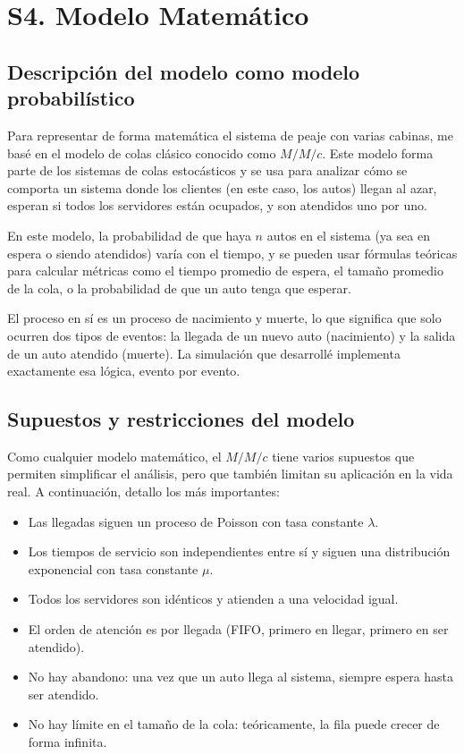 \documentclass[12pt]{article}
\begin{document}
\section*{S4. Modelo Matemático}

\subsection*{Descripción del modelo como modelo probabilístico}

Para representar de forma matemática el sistema de peaje con varias cabinas, me basé en el modelo de colas clásico conocido como $M/M/c$. Este modelo forma parte de los sistemas de colas estocásticos y se usa para analizar cómo se comporta un sistema donde los clientes (en este caso, los autos) llegan al azar, esperan si todos los servidores están ocupados, y son atendidos uno por uno.

En este modelo, la probabilidad de que haya $n$ autos en el sistema (ya sea en espera o siendo atendidos) varía con el tiempo, y se pueden usar fórmulas teóricas para calcular métricas como el tiempo promedio de espera, el tamaño promedio de la cola, o la probabilidad de que un auto tenga que esperar.

El proceso en sí es un proceso de nacimiento y muerte, lo que significa que solo ocurren dos tipos de eventos: la llegada de un nuevo auto (nacimiento) y la salida de un auto atendido (muerte). La simulación que desarrollé implementa exactamente esa lógica, evento por evento.

\subsection*{Supuestos y restricciones del modelo}

Como cualquier modelo matemático, el $M/M/c$ tiene varios supuestos que permiten simplificar el análisis, pero que también limitan su aplicación en la vida real. A continuación, detallo los más importantes:

\begin{itemize}
  \item Las llegadas siguen un proceso de Poisson con tasa constante $\lambda$.
  \item Los tiempos de servicio son independientes entre sí y siguen una distribución exponencial con tasa constante $\mu$.
  \item Todos los servidores son idénticos y atienden a una velocidad igual.
  \item El orden de atención es por llegada (FIFO, primero en llegar, primero en ser atendido).
  \item No hay abandono: una vez que un auto llega al sistema, siempre espera hasta ser atendido.
  \item No hay límite en el tamaño de la cola: teóricamente, la fila puede crecer de forma infinita.
\end{itemize}
\end{document}
